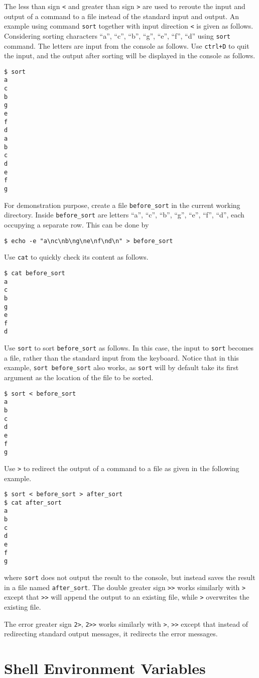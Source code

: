 The less than sign \verb|<| and greater than sign \verb|>| are used to reroute the input and output of a command to a file instead of the standard input and output. An example using command \verb|sort| together with input direction \verb|<| is given as follows. Considering sorting characters ``a'', ``c'', ``b'', ``g'', ``e'', ``f'', ``d'' using \verb|sort| command. The letters are input from the console as follows. Use \verb|ctrl+D| to quit the input, and the output after sorting will be displayed in the console as follows.
\begin{lstlisting}
$ sort
a
c
b
g
e
f
d
a
b
c
d
e
f
g
\end{lstlisting}
For demonstration purpose, create a file \verb|before_sort| in the current working directory. Inside \verb|before_sort| are letters ``a'', ``c'', ``b'', ``g'', ``e'', ``f'', ``d'', each occupying a separate row. This can be done by 
\begin{lstlisting}
$ echo -e "a\nc\nb\ng\ne\nf\nd\n" > before_sort
\end{lstlisting}
Use \verb|cat| to quickly check its content as follows.
\begin{lstlisting}
$ cat before_sort
a
c
b
g
e
f
d
\end{lstlisting}
Use \verb|sort| to sort \verb|before_sort| as follows. In this case, the input to \verb|sort| becomes a file, rather than the standard input from the keyboard. Notice that in this example, \verb|sort before_sort| also works, as \verb|sort| will by default take its first argument as the location of the file to be sorted.
\begin{lstlisting}
$ sort < before_sort
a
b
c
d
e
f
g
\end{lstlisting}
Use \verb|>| to redirect the output of a command to a file as given in the following example.
\begin{lstlisting}
$ sort < before_sort > after_sort
$ cat after_sort
a
b
c
d
e
f
g
\end{lstlisting}
where \verb|sort| does not output the result to the console, but instead saves the result in a file named \verb|after_sort|. The double greater sign \verb|>>| works similarly with \verb|>| except that \verb|>>| will append the output to an existing file, while \verb|>| overwrites the existing file.

The error greater sign \verb|2>|, \verb|2>>| works similarly with \verb|>|, \verb|>>| except that instead of redirecting standard output messages, it redirects the error messages.

\section{Shell Environment Variables}\label{ch:sb:subsec:shellenvvar}

